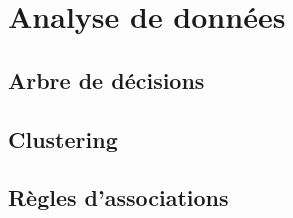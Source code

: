 \chapter{Analyse de données}


\section{Arbre de décisions}


\section{Clustering}


\section{Règles d'associations}


